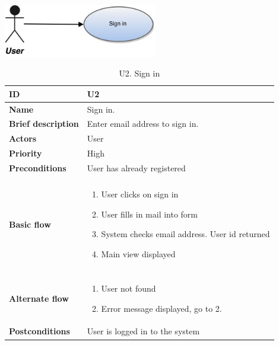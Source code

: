 \begin{table}[htp]
	\includegraphics[width=0.5\textwidth]{fig/U2}
	\centering
	\caption{U2. Sign in}
	\begin{tabular}[b]{|l | l|}\hline
		\textbf{ID} 				& U2									\\\hline
		\textbf{Name} 				& Sign in.								\\\hline
		\textbf{Brief description}	& Enter email address to sign in. 		\\\hline
		\textbf{Actors} 			& User									\\\hline
		\textbf{Priority}			& High									\\\hline
		\textbf{Preconditions}		& User has already registered			\\\hline&\\[-2ex]
		\textbf{Basic flow}			& \begin{minipage}{5in}
			\begin{enumerate}[noitemsep]
				\item User clicks on sign in
				\item User fills in mail into form
				\item System checks email address. User id returned
				\item Main view displayed
			\end{enumerate}						
		\end{minipage}						\\\hline&\\[-2ex]
		\textbf{Alternate flow}		& \begin{minipage}{5in}
			\begin{enumerate}[noitemsep]
				\item User not found
				\item Error message displayed, go to 2.
			\end{enumerate}
		\end{minipage}							\\\hline
		\textbf{Postconditions}		& User is logged in to the system\\\hline
	\end{tabular}
\end{table}


